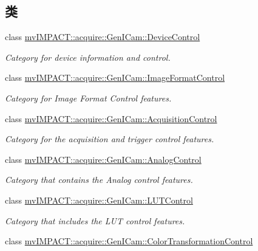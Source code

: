 \subsection*{类}
\begin{DoxyCompactItemize}
\item 
class \hyperlink{classmv_i_m_p_a_c_t_1_1acquire_1_1_gen_i_cam_1_1_device_control}{mv\+I\+M\+P\+A\+C\+T\+::acquire\+::\+Gen\+I\+Cam\+::\+Device\+Control}
\begin{DoxyCompactList}\small\item\em Category for device information and control. \end{DoxyCompactList}\item 
class \hyperlink{classmv_i_m_p_a_c_t_1_1acquire_1_1_gen_i_cam_1_1_image_format_control}{mv\+I\+M\+P\+A\+C\+T\+::acquire\+::\+Gen\+I\+Cam\+::\+Image\+Format\+Control}
\begin{DoxyCompactList}\small\item\em Category for Image Format Control features. \end{DoxyCompactList}\item 
class \hyperlink{classmv_i_m_p_a_c_t_1_1acquire_1_1_gen_i_cam_1_1_acquisition_control}{mv\+I\+M\+P\+A\+C\+T\+::acquire\+::\+Gen\+I\+Cam\+::\+Acquisition\+Control}
\begin{DoxyCompactList}\small\item\em Category for the acquisition and trigger control features. \end{DoxyCompactList}\item 
class \hyperlink{classmv_i_m_p_a_c_t_1_1acquire_1_1_gen_i_cam_1_1_analog_control}{mv\+I\+M\+P\+A\+C\+T\+::acquire\+::\+Gen\+I\+Cam\+::\+Analog\+Control}
\begin{DoxyCompactList}\small\item\em Category that contains the Analog control features. \end{DoxyCompactList}\item 
class \hyperlink{classmv_i_m_p_a_c_t_1_1acquire_1_1_gen_i_cam_1_1_l_u_t_control}{mv\+I\+M\+P\+A\+C\+T\+::acquire\+::\+Gen\+I\+Cam\+::\+L\+U\+T\+Control}
\begin{DoxyCompactList}\small\item\em Category that includes the L\+U\+T control features. \end{DoxyCompactList}\item 
class \hyperlink{classmv_i_m_p_a_c_t_1_1acquire_1_1_gen_i_cam_1_1_color_transformation_control}{mv\+I\+M\+P\+A\+C\+T\+::acquire\+::\+Gen\+I\+Cam\+::\+Color\+Transformation\+Control}

\end{DoxyCompactItemize}
